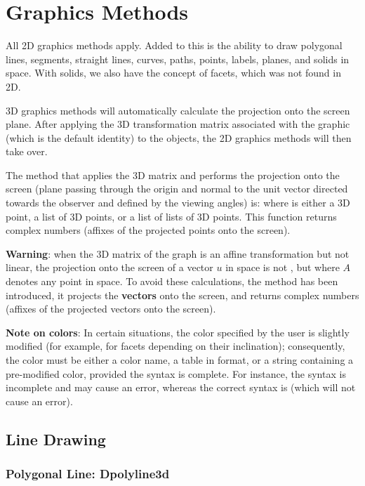 \section{Graphics Methods}

All 2D graphics methods apply. Added to this is the ability to draw polygonal lines, segments, straight lines, curves, paths, points, labels, planes, and solids in space. With solids, we also have the concept of facets, which was not found in 2D.

3D graphics methods will automatically calculate the projection onto the screen plane. After applying the 3D transformation matrix associated with the graphic (which is the default identity) to the objects, the 2D graphics methods will then take over.

The method that applies the 3D matrix and performs the projection onto the screen (plane passing through the origin and normal to the unit vector directed towards the observer and defined by the viewing angles) is:  where  is either a 3D point, a list of 3D points, or a list of lists of 3D points. This function returns complex numbers (affixes of the projected points onto the screen).

\textbf{Warning}: when the 3D matrix of the graph is an affine transformation but not linear, the projection onto the screen of a vector $u$ in space is not , but  where $A$ denotes any point in space. To avoid these calculations, the method  has been introduced, it projects the \textbf{vectors} onto the screen, and returns complex numbers (affixes of the projected vectors onto the screen).

\textbf{Note on colors}: In certain situations, the color specified by the user is slightly modified (for example, for facets depending on their inclination); consequently, the color must be either a color name, a table in  format, or a string containing a pre-modified color, provided the syntax is complete. For instance, the syntax  is incomplete and may cause an error, whereas the correct syntax is  (which will not cause an error).

\subsection{Line Drawing}

\subsubsection{Polygonal Line: Dpolyline3d}

